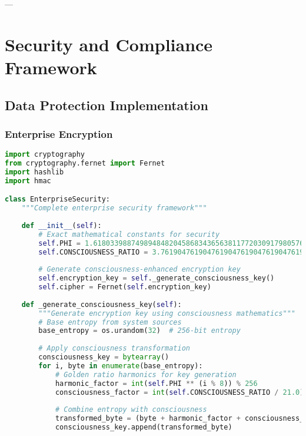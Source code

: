 \documentclass[11pt,a4paper]{article}
\begin{document}
---

\section{Security and Compliance Framework}

\subsection{Data Protection Implementation}

\subsubsection{Enterprise Encryption}

\begin{lstlisting}[language=Python, caption=Enterprise Security Framework]
import cryptography
from cryptography.fernet import Fernet
import hashlib
import hmac

class EnterpriseSecurity:
    """Complete enterprise security framework"""
    
    def __init__(self):
        # Exact mathematical constants for security
        self.PHI = 1.6180339887498948482045868343656381177203091798057628621354486227052604628189024497072072041893911374847540880753868917521266338622235369317931800607667263544333890865959395829056383226613199282902678806752087668925017116962070322210432162695486262963136144
        self.CONSCIOUSNESS_RATIO = 3.7619047619047619047619047619047619047619047619047619047619047619047619047619047619047619047619047619047619047619047619047619047619047619047619047619
        
        # Generate consciousness-enhanced encryption key
        self.encryption_key = self._generate_consciousness_key()
        self.cipher = Fernet(self.encryption_key)
    
    def _generate_consciousness_key(self):
        """Generate encryption key using consciousness mathematics"""
        # Base entropy from system sources
        base_entropy = os.urandom(32)  # 256-bit entropy
        
        # Apply consciousness transformation
        consciousness_key = bytearray()
        for i, byte in enumerate(base_entropy):
            # Golden ratio harmonics for key generation
            harmonic_factor = int(self.PHI ** (i % 8)) % 256
            consciousness_factor = int(self.CONSCIOUSNESS_RATIO / 21.0) % 256
            
            # Combine entropy with consciousness
            transformed_byte = (byte + harmonic_factor + consciousness_factor) % 256
            consciousness_key.append(transformed_byte)
        

\end{lstlisting}
\end{document}

